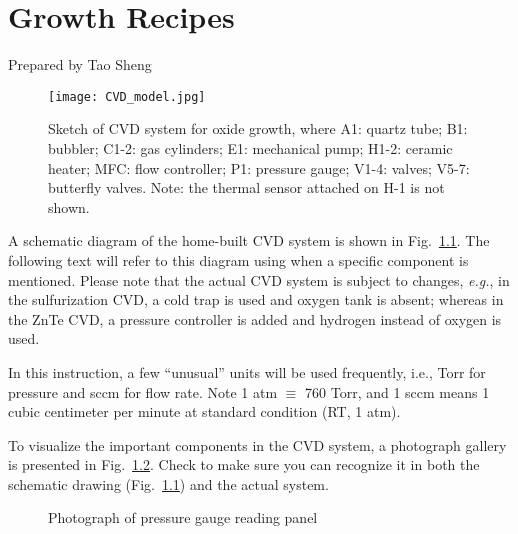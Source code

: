 \chapter{Growth Recipes}

\date{\today}
Prepared by Tao Sheng

\begin{landscape}
\begin{figure}[htb]
\centering
\texttt{[image: CVD\_model.jpg]}
\caption{Sketch of CVD system for oxide growth, where A1: quartz tube; B1: bubbler; C1-2: gas cylinders; E1: mechanical pump; H1-2: ceramic heater; MFC: flow controller; P1: pressure gauge; V1-4: valves; V5-7: butterfly valves. Note: the thermal sensor attached on H-1 is not shown. }
\label{fig:ch2cvd}
\end{figure}
\end{landscape}


A schematic diagram of the home-built CVD system is shown in Fig.~\ref{fig:ch2cvd}. 
The following text will refer to this diagram using  when a specific component is mentioned. Please note that the actual CVD system is subject to changes, \emph{e.g.}, in the sulfurization CVD, a cold trap is used and oxygen tank is absent; whereas in the ZnTe CVD, a pressure controller is added and hydrogen instead of oxygen is used. 

In this instruction, a few ``unusual'' units will be used frequently, i.e., Torr for pressure and sccm for flow rate. Note 1 atm $\equiv$ 760 Torr, and 1 sccm means 1 cubic centimeter per minute at standard condition (RT, 1 atm). 

To visualize the important components in the CVD system, a photograph gallery is presented in Fig.~\ref{fig:gallery}. Check to make sure you can recognize it in both the schematic drawing (Fig.~\ref{fig:ch2cvd}) and the actual system. 

\begin{figure}[htb]
\centering
{}\hspace{0.04\textwidth}

\caption{Photograph of pressure gauge reading panel}
\label{fig:gallery}
\end{figure}



